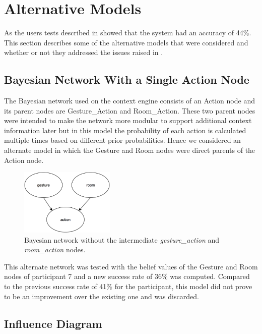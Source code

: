 \section{Alternative Models}
\label{sec:evaluation:alternative-models}

As the users tests described in  showed that the system had an accuracy of 44\%. This section describes some of the alternative models that were considered and whether or not they addressed the issues raised in .

\subsection{Bayesian Network With a Single Action Node}

The Bayesian network used on the context engine consists of an Action node and its parent nodes are Gesture\_Action and Room\_Action.
These two parent nodes were intended to make the network more modular to support additional context information later but in this model the probability of each action is calculated multiple times based on different prior probabilities.
Hence we considered an alternate model in which the Gesture and Room nodes were direct parents of the Action node.

\begin{figure}[h]
\centering
\includegraphics[width=0.40\textwidth]{images/DirectParentBaysianNetwork}
\caption{Bayesian network without the intermediate \emph{gesture\_action} and \emph{room\_action} nodes.}
\label{fig:evaluation:alternative-models:direct-parents}
\end{figure}

This alternate network was tested with the belief values of the Gesture and Room nodes of participant 7 and a new success rate of 36\% was computed.
Compared to the previous success rate of 41\% for the participant, this model did not prove to be an improvement over the existing one and was discarded.

\subsection{Influence Diagram}

